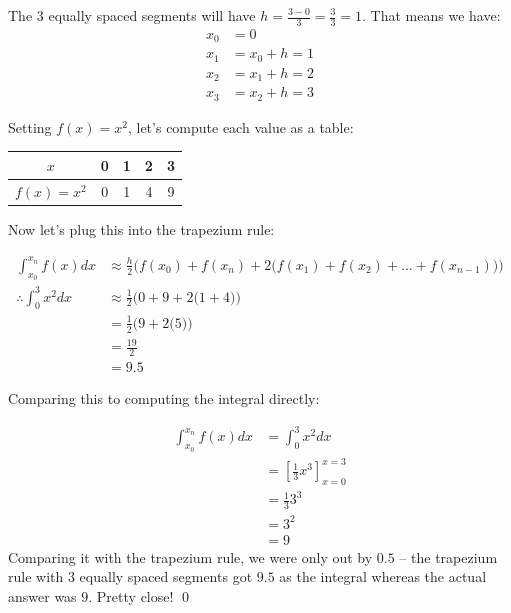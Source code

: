 \begin{solution}
    The $3$ equally spaced segments will have $h = \frac{3 - 0}{3} = \frac{3}{3} = 1$. That means we have:
    \begin{align*}
        x_0 &= 0 \\
        x_1 &= x_0 + h = 1 \\
        x_2 &= x_1 + h = 2 \\
        x_3 &= x_2 + h = 3
    \end{align*}

    Setting $f(x) = x^2$, let's compute each value as a table:

    \begin{center}
    \begin{tabular}{c|cccc}
    $x$        & 0 & 1 & 2 & 3 \\
    \hline
    $f(x)=x^2$ & 0 & 1 & 4 & 9
    \end{tabular}
    \end{center}

    Now let's plug this into the trapezium rule:

    \begin{align*}
    \int_{x_0}^{x_n}f(x) dx  &\approx  \frac{h}{2} \bigg(  f(x_0) + f(x_n) + 2\big( f(x_{1})+ f(x_{2}) + \dots + f(x_{n-1})\big) \bigg) \\
    \therefore \int_{0}^{3}x^2 dx  &\approx  \frac{1}{2} \bigg(  0 + 9 + 2\big( 1 + 4 \big) \bigg) \\
    &= \frac{1}{2} \bigg(  9+ 2\big( 5 \big) \bigg) \\
    &= \frac{19}{2}\\
    &= 9.5
    \end{align*} 

    Comparing this to computing the integral directly:

    \begin{align*}
    \int_{x_0}^{x_n}f(x) dx  &=  \int_0^3 x^2 dx \\
     &= \left[\frac{1}{3}x^3\right]_{x=0}^{x=3}\\ 
     &= \frac{1}{3}3^3 \\
     &= 3^2 \\
     &= 9
    \end{align*} 
    Comparing it with the trapezium rule, we were only out by $0.5$ -- the trapezium rule with $3$ equally spaced segments got $9.5$ as the integral whereas the actual answer was $9$. Pretty close!
    \qed
\end{solution}

